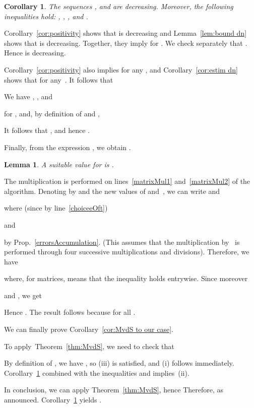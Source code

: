 \documentclass[10pt, conference]{IEEEtran}
\newtheorem{corollary}{Corollary}
\newtheorem{lemma}{Lemma}
\begin{document}
\begin{corollary} \mightbeomitted
  \label{cor:ineqs for MvdS}
  The sequences ,  and  are decreasing. Moreover, the following inequalities hold: , , , and .
\end{corollary}
\begin{IEEEproof}
  Corollary~\ref{cor:positivity} shows that  is decreasing and Lemma~\ref{lem:bound dn} shows that  is decreasing. Together, they imply
 for . We check separately that .
Hence  is decreasing.

Corollary~\ref{cor:positivity} also implies  for any , and Corollary~\ref{cor:estim dn} shows that  for any~.
It follows that


We have , , and

for ,
and, by definition of  and ,
\setlength{\arraycolsep}{2pt}

It follows that
,
and hence
.

Finally, from the expression , we obtain .
\end{IEEEproof}
\begin{lemma}
A suitable value for  is .
\end{lemma}
\begin{IEEEproof}
  The multiplication  is performed on lines~\ref{matrixMul1}
  and~\ref{matrixMul2} of the algorithm.
  Denoting by  and  the new values of  and~, we can write  and
  
  where (since  by line~\ref{choiceeOft})
  
  and
  
  by Prop.~\ref{errorsAccumulation}.
  (This assumes that the multiplication by~ is performed through four successive multiplications and divisions). Therefore, we have

where, for matrices,  means that the inequality holds entrywise. Since moreover

and , we get

  Hence . The
result follows because  for all .
\end{IEEEproof}

We can finally prove Corollary~\ref{cor:MvdS to our case}.
\begin{IEEEproof}
    To apply~Theorem~\ref{thm:MvdS}, we need to check that
    
    By definition of , we have , so (iii) is satisfied, and (i) follows immediately.
    Corollary~\ref{cor:ineqs for MvdS} combined with the inequalities  and  implies~(ii).

In conclusion, we can apply Theorem~\ref{thm:MvdS}, hence 
 Therefore,  as announced.
Corollary~\ref{cor:ineqs for MvdS} yields .
\end{IEEEproof}
\end{document}
